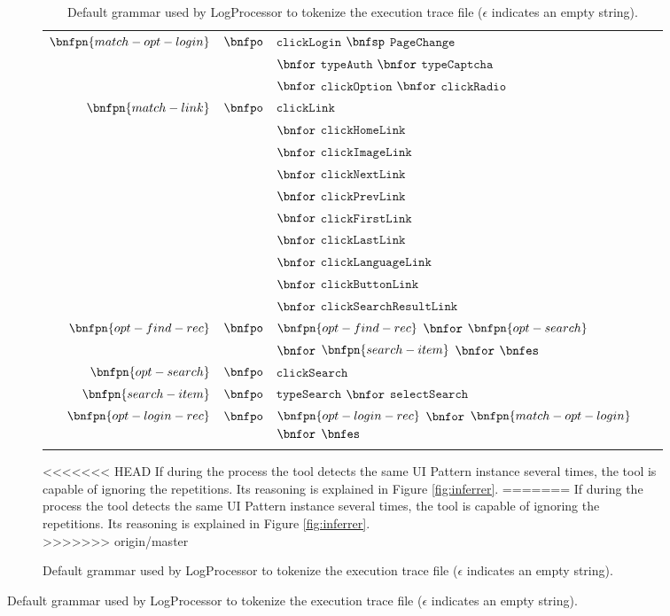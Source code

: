 \documentclass[conference]{IEEEtran}
\begin{document}
\begin{enumerate}
\begin{figure}[!htb]
\begin{itemize}
\begin{figure}[!htb]
\begin{itemize}
\begin{table}[!htb]
\begin{tabular}{rcl}
  $\bnfpn{match-opt-login}$ & $\bnfpo$ &  $\texttt{clickLogin}$ $\bnfsp$ $\texttt{PageChange}$ \\
  & & $\bnfor$ $\texttt{typeAuth}$ $\bnfor$ $\texttt{typeCaptcha}$ \\
  & & $\bnfor$ $\texttt{clickOption}$ $\bnfor$ $\texttt{clickRadio}$ \\
  
  $\bnfpn{match-link}$ & $\bnfpo$ &  $\texttt{clickLink}$ \\
   & & $\bnfor$ $\texttt{clickHomeLink}$ \\
   & & $\bnfor$ $\texttt{clickImageLink}$ \\
   & & $\bnfor$ $\texttt{clickNextLink}$ \\
   & & $\bnfor$ $\texttt{clickPrevLink}$ \\
   & & $\bnfor$ $\texttt{clickFirstLink}$ \\
   & & $\bnfor$ $\texttt{clickLastLink}$ \\
   & & $\bnfor$ $\texttt{clickLanguageLink}$ \\
   & & $\bnfor$ $\texttt{clickButtonLink}$ \\
   & & $\bnfor$ $\texttt{clickSearchResultLink}$ \\
  
  $\bnfpn{opt-find-rec}$ & $\bnfpo$ &  $\bnfpn{opt-find-rec}$ $\bnfor$ $\bnfpn{opt-search}$ \\
  & & $\bnfor$ $\bnfpn{search-item}$ $\bnfor$ $\bnfes$ \\
  
  $\bnfpn{opt-search}$ & $\bnfpo$ &  $\texttt{clickSearch}$ \\
  
  $\bnfpn{search-item}$ & $\bnfpo$ &  $\texttt{typeSearch}$ $\bnfor$ $\texttt{selectSearch}$ \\
  
  $\bnfpn{opt-login-rec}$ & $\bnfpo$ &  $\bnfpn{opt-login-rec}$ $\bnfor$ $\bnfpn{match-opt-login}$ $\bnfor$ $\bnfes$ \\
  & & \\
  \end{tabular}
\caption{Default grammar used by LogProcessor to tokenize the execution trace file ($\epsilon$ indicates an empty string).}
\label{tab:grammar}
\end{table}

<<<<<<< HEAD
If during the process the tool detects the same UI Pattern instance several times, the tool is capable of ignoring the repetitions. Its reasoning is explained in Figure \ref{fig:inferrer}.
=======
If during the process the tool detects the same UI Pattern instance several times, the tool is capable of ignoring the repetitions. Its reasoning is explained in Figure \ref{fig:inferrer}.\\
>>>>>>> origin/master


\end{itemize}
\end{figure}
\end{itemize}
\end{figure}
\end{enumerate}
\end{document}
